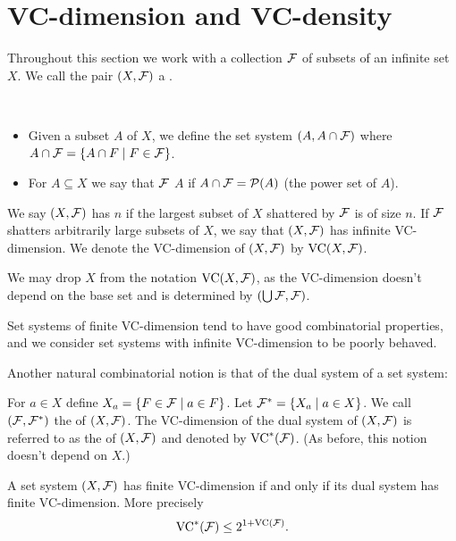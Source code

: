 \section{VC-dimension and VC-density}
Throughout this section we work with a collection $\mathcal F$ of subsets of an infinite set $X$.
We call the pair $(X, \mathcal F)$ a .

\begin{Definition} \ 
  \begin{itemize} 
  \item Given a subset $A$ of $X$, we define the set system $(A, A \cap \mathcal F)$
    where $A \cap \mathcal F = \left\{A \cap F \mid F\in \mathcal F\right\}$.
  \item For $A \subseteq X$ we say that $\mathcal F$  $A$ if $A \cap \mathcal F = \mathcal P(A)$ (the power set of $A$).
  \end{itemize}    
\end{Definition}  

\begin{Definition}
  We say $(X, \mathcal F)$ has  $n$ if the largest subset of $X$ shattered by $\mathcal F$ is of size $n$.
  If $\mathcal F$ shatters arbitrarily large subsets of $X$, we say that $(X, \mathcal F)$ has infinite VC-dimension.
  We denote the VC-dimension of $(X, \mathcal F)$ by $\operatorname{VC}(X, \mathcal F)$.
\end{Definition}  

\begin{Note}
  We may drop $X$ from the notation $\operatorname{VC}(X, \mathcal F)$, as the VC-dimension doesn't depend on the base set and is determined by $(\bigcup \mathcal F, \mathcal F)$.
\end{Note}
Set systems of finite VC-dimension tend to have good combinatorial properties,
and we consider set systems with infinite VC-dimension to be poorly behaved.

Another natural combinatorial notion is that of the dual system of a set system:
\begin{Definition}
  For $a \in X$ define $X_a = \left\{F \in \mathcal F \mid a \in F\right\}$.
  Let $\mathcal F^* = \left\{X_a \mid a \in X\right\}$.
  We call $(\mathcal F, \mathcal F^*)$ the  of $(X, \mathcal F)$.
  The VC-dimension of the dual system of $(X, \mathcal F)$ is referred to as the  of $(X, \mathcal F)$ and denoted by $\operatorname{VC}^*(\mathcal F)$.
  (As before, this notion doesn't depend on $X$.)
\end{Definition}  

\begin{Lemma} 
  A set system $(X, \mathcal F)$ has finite VC-dimension if and only if its dual system has finite VC-dimension.
  More precisely
  \begin{align*}
    \operatorname{VC}^*(\mathcal F) \leq 2^{1+\operatorname{VC}(\mathcal F)}.
  \end{align*}
\end{Lemma}


